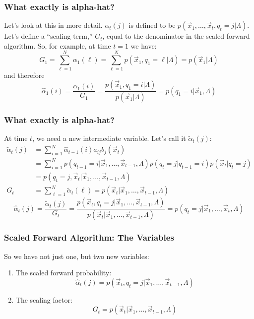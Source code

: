 \documentclass{beamer}
\begin{document}
\begin{frame}
  \frametitle{What exactly is alpha-hat?}

  Let's look at this in more detail.  $\alpha_t(j)$ is defined to be
  $p(\vec{x}_1,\ldots,\vec{x}_t,q_t=j|\Lambda)$.  Let's define a
  ``scaling term,'' $G_t$, equal to the denominator in the scaled
  forward algorithm.  So, for example, at time $t=1$ we have:
  \begin{displaymath}
  G_1 = \sum_{\ell=1}^N \alpha_1(\ell)= \sum_{\ell=1}^N p(\vec{x}_1,q_1=\ell|\Lambda)
  = p(\vec{x}_1|\Lambda)
  \end{displaymath}
  and therefore
  \begin{displaymath}
  \hat\alpha_1(i) = \frac{\alpha_1(i)}{G_1} 
  = \frac{p(\vec{x}_1,q_1=i|\Lambda)}{p(\vec{x}_1|\Lambda)}
  = p(q_1=i|\vec{x}_1,\Lambda)
  \end{displaymath}
\end{frame}

\begin{frame}
  \frametitle{What exactly is alpha-hat?}
  At time $t$, we need a new intermediate variable.  Let's call it $\tilde\alpha_t(j)$:
  \begin{align*}
  \tilde\alpha_t(j) &= \sum_{i=1}^N \hat\alpha_{t-1}(i) a_{ij}b_j(\vec{x}_t)\\
  &= \sum_{i=1}^N p(q_{t-1}=i|\vec{x}_1,\ldots,\vec{x}_{t-1},\Lambda)p(q_t=j|q_{t-1}=i)p(\vec{x}_t|q_t=j)\\
  &= p(q_{t}=j,\vec{x}_t|\vec{x}_1,\ldots,\vec{x}_{t-1},\Lambda)\\
  G_t &= \sum_{\ell=1}^N \tilde\alpha_t(\ell) = p(\vec{x}_t|\vec{x}_1,\ldots,\vec{x}_{t-1},\Lambda)
  \end{align*}
  \begin{displaymath}
  \hat\alpha_t(j) = \frac{\tilde\alpha_t(j)}{G_t}
  = \frac{p(\vec{x}_t,q_t=j|\vec{x}_1,\ldots,\vec{x}_{t-1},\Lambda)}{p(\vec{x}_t|\vec{x}_1,\ldots,\vec{x}_{t-1},\Lambda)}
  = p(q_t=j|\vec{x}_1,\ldots,\vec{x}_t,\Lambda)
  \end{displaymath}
\end{frame}

\begin{frame}
  \frametitle{Scaled Forward Algorithm: The Variables}

  So we have not just one, but two new variables:
  \begin{enumerate}
  \item The scaled forward probability:
    \begin{displaymath}
      \hat\alpha_t(j) = p(\vec{x}_t,q_t=j|\vec{x}_1,\ldots,\vec{x}_{t-1},\Lambda)
    \end{displaymath}
  \item The scaling factor:
    \begin{displaymath}
      G_t = p(\vec{x}_t|\vec{x}_1,\ldots,\vec{x}_{t-1},\Lambda)
    \end{displaymath}
  \end{enumerate}
\end{frame}
\end{document}
